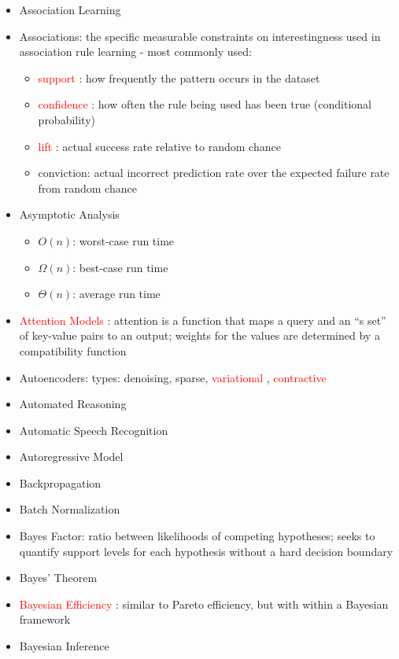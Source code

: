\documentclass[a4paper]{article}
\newcommand{\cmark}{\ding{51}}%
\newcommand{\done}{\rlap{$\square$}{\raisebox{2pt}{\large\hspace{1pt}\cmark}}\hspace{-2.5pt}}
\newcommand{\followup}[1]{\textcolor{red}{ #1 }}
\begin{document}
\begin{itemize}
    \item [\done] Association Learning
    \item [\done] Associations: the specific measurable constraints on interestingness used in association rule learning - most commonly used:
    \begin{itemize}
        \item \followup{support}: how frequently the pattern occurs in the dataset
        \item \followup{confidence}: how often the rule being used has been true (conditional probability)
        \item \followup{lift}: actual success rate relative to random chance
        \item conviction: actual incorrect prediction rate over the expected failure rate from random chance
    \end{itemize}
    \item [\done] Asymptotic Analysis
    \begin{itemize}
        \item $O(n)$: worst-case run time
        \item $\Omega(n)$: best-case run time
        \item $\Theta(n)$: average run time
    \end{itemize}
    \item [\done] \followup{Attention Models}: attention is a function that maps a query and an ``s set'' of key-value pairs to an output; weights for the values are determined by a compatibility function
    \item [\done] Autoencoders: types: denoising, sparse, \followup{variational}, \followup{contractive}
    \item [\done] Automated Reasoning
    \item [\done] Automatic Speech Recognition
    \item [\done] Autoregressive Model
    \item [\done] Backpropagation
    \item [\done] Batch Normalization
    \item [\done] Bayes Factor: ratio between likelihoods of competing hypotheses; seeks to quantify support levels for each hypothesis without a hard decision boundary 
    \item [\done] Bayes' Theorem
    \item [\done] \followup{Bayesian Efficiency}: similar to Pareto efficiency, but with within a Bayesian framework
    \item [\done] Bayesian Inference

\end{itemize}
\end{document}
